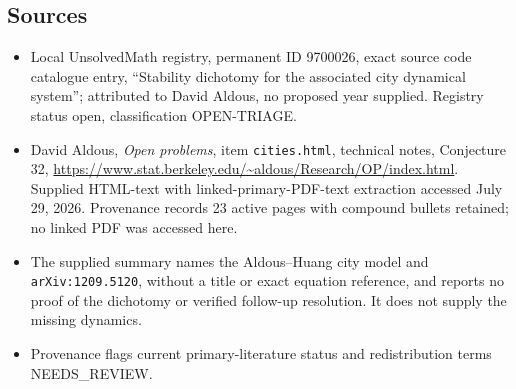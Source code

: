 \documentclass[11pt]{article}
\begin{document}
\subsection{Sources}
\begin{itemize}
\item Local UnsolvedMath registry, permanent ID 9700026, exact source code catalogue entry, ``Stability dichotomy for the associated city dynamical system''; attributed to David Aldous, no proposed year supplied. Registry status open, classification OPEN-TRIAGE.
\item David Aldous, \emph{Open problems}, item \texttt{cities.html}, technical notes, Conjecture 32, \url{https://www.stat.berkeley.edu/~aldous/Research/OP/index.html}. Supplied HTML-text with linked-primary-PDF-text extraction accessed July 29, 2026. Provenance records 23 active pages with compound bullets retained; no linked PDF was accessed here.
\item The supplied summary names the Aldous--Huang city model and \texttt{arXiv:1209.5120}, without a title or exact equation reference, and reports no proof of the dichotomy or verified follow-up resolution. It does not supply the missing dynamics.
\item Provenance flags current primary-literature status and redistribution terms NEEDS\_REVIEW.
\end{itemize}
\end{document}
